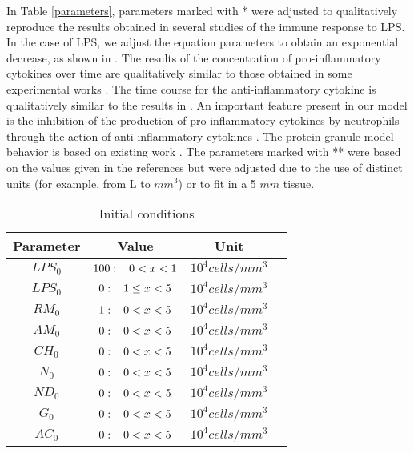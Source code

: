 \documentclass[10pt]{bmc_article}
\newenvironment{bmcformat}{\baselineskip20pt\sloppy\setboolean{publ}{false}}{\baselineskip20pt\sloppy}
\begin{document}
\begin{bmcformat}

In Table \ref{parameters}, parameters marked with * were adjusted to qualitatively reproduce the results obtained in several 
studies of the immune response to LPS. In the case of LPS, we adjust the equation parameters to obtain an exponential decrease, 
as shown in \cite{Li2002}. The results of the concentration of pro-inflammatory cytokines over time are qualitatively similar to 
those obtained in some experimental works \cite{Malefyt01111991, Oswald1992, 2007851}. The time course for the anti-inflammatory 
cytokine is qualitatively similar to the results in \cite{Malefyt01111991}. An important feature present in our model is the 
inhibition of the production of pro-inflammatory cytokines by neutrophils through the action of anti-inflammatory 
cytokines \cite{Marie1996}. The protein granule model behavior is based on existing work \cite{19652869}.
The parameters marked with ** were based on the values given in the references but were adjusted due to the use of distinct units 
(for example, from L to $mm^3$) or to fit in a 5 $mm$ tissue. 



\begin{table}[htpb]
\centering
\caption{Initial conditions}
\begin{tabular}{cccc}
\hline
\textbf{Parameter} & \textbf{Value} & \textbf{Unit}   \\
\hline 
$LPS_0$ & $100: \hspace{3 mm}  0 < x < 1$ & $10^4 cells/mm^3$ \\
\hline
$LPS_0$ & $0: \hspace{3 mm}  1 \le x < 5$ & $10^4 cells/mm^3$ \\
\hline
$RM_0$ & $1: \hspace{3 mm} 0 < x < 5$ & $10^4 cells/mm^3$ \\
\hline 
$AM_0$ & $0: \hspace{3 mm} 0 < x < 5$ & $10^4 cells/mm^3$ \\
\hline 
$CH_0$ & $0: \hspace{3 mm} 0 < x < 5$ & $10^4 cells/mm^3$ \\
\hline 
$N_0$ & $0: \hspace{3 mm} 0 < x < 5$ & $10^4 cells/mm^3$ \\
\hline 
$ND_0$ & $0:\hspace{3 mm} 0 < x < 5$ & $10^4 cells/mm^3$ \\
\hline  
$G_0$ & $0:\hspace{3 mm} 0 < x < 5$ & $10^4 cells/mm^3$ \\
\hline 
$AC_0$ & $0:\hspace{3 mm} 0 < x < 5$ &  $10^4 cells/mm^3$ 
\end{tabular}
\label{initialConditions} 
\end{table}



\end{bmcformat}
\end{document}
